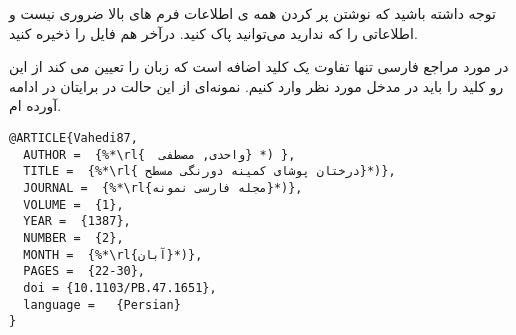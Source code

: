 توجه داشته باشید که نوشتن پر کردن همه ی اطلاعات فرم های بالا ضروری نیست و اطلاعاتی را که ندارید می‌توانید پاک کنید. درآخر هم فایل را ذخیره کنید.

در مورد مراجع فارسی تنها تفاوت یک کلید اضافه است که زبان را تعیین می کند از این  رو کلید  را باید در مدخل مورد نظر وارد کنیم. نمونه‌ای از این حالت در برایتان در ادامه آورده ام.
\begin{latin}
	\begin{lstlisting}[style=Tex]
@ARTICLE{Vahedi87,
  AUTHOR =  {%*\rl{  واحدی, مصطفی} *) },
  TITLE =  {%*\rl{ درختان پوشای کمینه دورنگی مسطح}*)},
  JOURNAL =  {%*\rl{مجله فارسی نمونه}*)},
  VOLUME =  {1},
  YEAR =  {1387},
  NUMBER =  {2},
  MONTH =  {%*\rl{آبان}*)},
  PAGES =  {22-30},
  doi = {10.1103/PB.47.1651},
  language =   {Persian}
}
	\end{lstlisting}
\end{latin}
	
